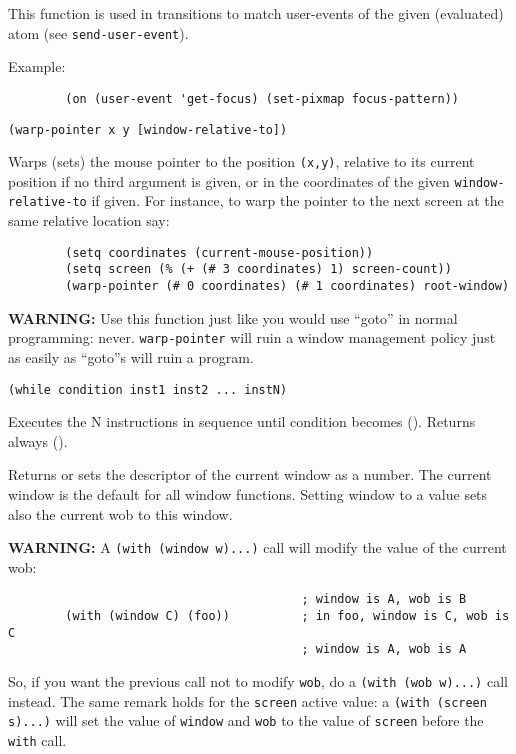 This function is used in transitions to match user-events of the given
(evaluated) atom (see \verb"send-user-event").

Example:
{\exemplefont\upspace\begin{verbatim}
        (on (user-event 'get-focus) (set-pixmap focus-pattern))
\end{verbatim}}


{\usagefont\begin{verbatim}
(warp-pointer x y [window-relative-to])
\end{verbatim}}\usageupspace

Warps (sets) the mouse pointer to the position \verb"(x,y)", relative to
its current position if no third argument is given, or in the
coordinates of the given \verb"window-relative-to" if given.
For instance, to warp the pointer to the next screen at the same relative
location say:

{\exemplefont\begin{verbatim}
        (setq coordinates (current-mouse-position))
        (setq screen (% (+ (# 3 coordinates) 1) screen-count))
        (warp-pointer (# 0 coordinates) (# 1 coordinates) root-window)
\end{verbatim}}

{\bf WARNING:} Use this function just like you would use ``goto'' in
normal programming: never. \verb"warp-pointer" will ruin a window management policy
just as easily as  ``goto''s will ruin a program.

        
{\usagefont\begin{verbatim}
(while condition inst1 inst2 ... instN)
\end{verbatim}}\usageupspace

Executes the N instructions in sequence until condition becomes ().  Returns
always ().      

        

Returns or sets the descriptor of the current window as a {\WOOL} number. The
current window is the default for all window functions. Setting window
to a value sets also the current wob to this window.

{\bf WARNING:} A \verb"(with (window w)...)" call will modify the value of
the current wob:
{\exemplefont\begin{verbatim}
                                         ; window is A, wob is B
        (with (window C) (foo))          ; in foo, window is C, wob is C
                                         ; window is A, wob is A
\end{verbatim}}
So, if you want the previous call not to modify \verb"wob", do a 
\verb"(with (wob w)...)" call instead. The same remark holds for the 
\verb"screen" active value: a \verb"(with (screen s)...)" will set the value
of {\tt window} and {\tt wob} to the value of {\tt screen} before the 
{\tt with} call.


